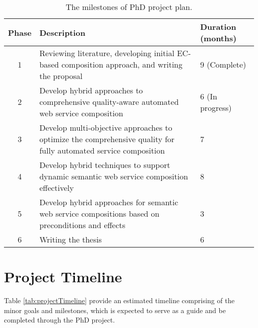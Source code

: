 \begin{table}
\small
\centering
\caption{The milestones of PhD project plan.}
\vspace{0.2cm}
\begin{tabular}{|c|p{100mm}|l|}
\hline
Phase & Description & Duration (months) \\ \hline
1 & Reviewing literature, developing initial EC-based composition approach, and writing the proposal & 9 (Complete)  \\
2 & Develop hybrid approaches to comprehensive quality-aware automated web service composition & 6 (In progress) \\
3 & Develop multi-objective approaches to optimize the comprehensive quality for fully automated service composition & 7 \\
4 & Develop hybrid techniques to support dynamic semantic web service composition effectively & 8 \\
5 & Develop hybrid approaches for semantic web service compositions based on preconditions and effects & 3 \\
6 & Writing the thesis & 6 \\ \hline
\end{tabular}
\label{tab:projectOverview}
\end{table}

\section{Project Timeline}

Table \ref{tab:projectTimeline} provide an estimated timeline comprising of the minor goals and milestones, which is expected to serve as a guide and be completed through the PhD project.


